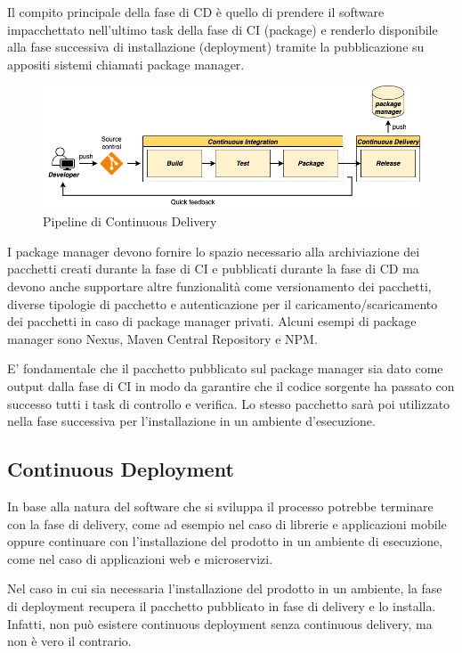 Il compito principale della fase di CD è quello di prendere il software impacchettato nell'ultimo task della fase di CI (package) e renderlo disponibile alla fase successiva di installazione (deployment) tramite la pubblicazione su appositi sistemi chiamati package manager.

\begin{figure}[H]
    \centering
    \includegraphics[width=1\textwidth]{img/cd-pipeline.png}
    \caption{Pipeline di Continuous Delivery}
    \label{cd-pipeline}
\end{figure}

I package manager devono fornire lo spazio necessario alla archiviazione dei pacchetti creati durante la fase di CI e pubblicati durante la fase di CD ma devono anche supportare altre funzionalità come versionamento dei pacchetti, diverse tipologie di pacchetto e autenticazione per il caricamento/scaricamento dei pacchetti in caso di package manager privati. Alcuni esempi di package manager sono Nexus, Maven Central Repository e NPM.

E' fondamentale che il pacchetto pubblicato sul package manager sia dato come output dalla fase di CI in modo da garantire che il codice sorgente ha passato con successo tutti i task di controllo e verifica. Lo stesso pacchetto sarà poi utilizzato nella fase successiva per l'installazione in un ambiente d'esecuzione. 

\subsection{Continuous Deployment}
In base alla natura del software che si sviluppa il processo potrebbe terminare con la fase di delivery, come ad esempio nel caso di librerie e applicazioni mobile oppure continuare con l'installazione del prodotto in un ambiente di esecuzione, come nel caso di applicazioni web e microservizi. 

Nel caso in cui sia necessaria l'installazione del prodotto in un ambiente, la fase di deployment recupera il pacchetto pubblicato in fase di delivery e lo installa. Infatti, non può esistere continuous deployment senza continuous delivery, ma non è vero il contrario.

